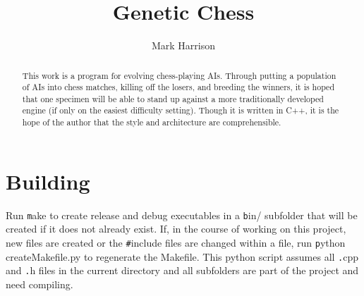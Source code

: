 \documentclass[letter]{article}
\title{Genetic Chess}
\author{Mark Harrison}
\newcommand{\cpp}{C{\nobreak +}{\nobreak +}}
\newcommand{\code}[1]{{\texttt #1}}
\renewcommand\_{\textunderscore\allowbreak}
\begin{document}
\maketitle

\begin{abstract}
This work is a program for evolving chess-playing AIs.  Through putting a population of AIs into chess matches, killing off the losers, and breeding the winners, it is hoped that one specimen will be able to stand up against a more traditionally developed engine (if only on the easiest difficulty setting). Though it is written in \cpp{}, it is the hope of the author that the style and architecture are comprehensible.
\end{abstract}

\tableofcontents{}


\section{Building}
Run \code{make} to create release and debug executables in a \code{bin/} subfolder that will be created if it does not already exist. If, in the course of working on this project, new files are created or the \code{\#include} files are changed within a file, run \code{python create\_Makefile.py} to regenerate the Makefile. This python script assumes all \code{*.cpp} and \code{*.h} files in the current directory and all subfolders are part of the project and need compiling.
\end{document}
